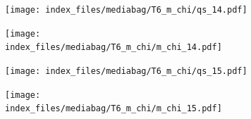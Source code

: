 \documentclass[
  11pt,
  letterpaper,
]{scrreprt}
\begin{document}
\begin{figure}

\begin{minipage}{0.50\linewidth}

\begin{figure}[H]

{\centering \texttt{[image: index\_files/mediabag/T6\_m\_chi/qs\_14.pdf]}

}


\end{figure}%

\end{minipage}%
%
\begin{minipage}{0.50\linewidth}

\begin{figure}[H]

{\centering \texttt{[image: index\_files/mediabag/T6\_m\_chi/m\_chi\_14.pdf]}

}


\end{figure}%

\end{minipage}%

\end{figure}%

\begin{figure}

\begin{minipage}{0.50\linewidth}

\begin{figure}[H]

{\centering \texttt{[image: index\_files/mediabag/T6\_m\_chi/qs\_15.pdf]}

}


\end{figure}%

\end{minipage}%
%
\begin{minipage}{0.50\linewidth}

\begin{figure}[H]

{\centering \texttt{[image: index\_files/mediabag/T6\_m\_chi/m\_chi\_15.pdf]}

}


\end{figure}%

\end{minipage}%

\end{figure}%
\end{document}
